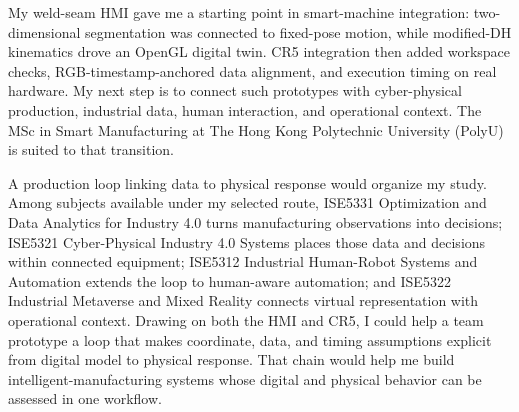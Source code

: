My weld-seam HMI gave me a starting point in smart-machine integration: two-dimensional segmentation was connected to fixed-pose motion, while modified-DH kinematics drove an OpenGL digital twin. CR5 integration then added workspace checks, RGB-timestamp-anchored data alignment, and execution timing on real hardware. My next step is to connect such prototypes with cyber-physical production, industrial data, human interaction, and operational context. The MSc in Smart Manufacturing at The Hong Kong Polytechnic University (PolyU) is suited to that transition.

A production loop linking data to physical response would organize my study. Among subjects available under my selected route, ISE5331 Optimization and Data Analytics for Industry 4.0 turns manufacturing observations into decisions; ISE5321 Cyber-Physical Industry 4.0 Systems places those data and decisions within connected equipment; ISE5312 Industrial Human-Robot Systems and Automation extends the loop to human-aware automation; and ISE5322 Industrial Metaverse and Mixed Reality connects virtual representation with operational context. Drawing on both the HMI and CR5, I could help a team prototype a loop that makes coordinate, data, and timing assumptions explicit from digital model to physical response. That chain would help me build intelligent-manufacturing systems whose digital and physical behavior can be assessed in one workflow.
